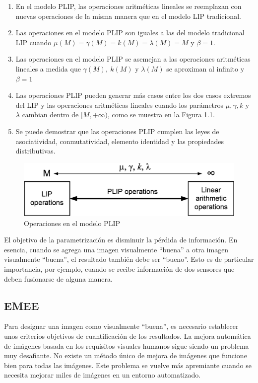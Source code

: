 \begin{enumerate}
	\item En el modelo PLIP, las operaciones aritméticas lineales se reemplazan con nuevas operaciones de la misma manera que en el modelo LIP tradicional.
	\item Las operaciones en el modelo PLIP son iguales a las del modelo tradicional LIP cuando $\mu(M) = \gamma(M) = k(M) = \lambda(M) = M$ y
	$\beta = 1$.
	\item Las operaciones en el modelo PLIP se asemejan a las operaciones aritméticas lineales a medida que $\gamma(M),~k(M)$ y $\lambda(M)$ se aproximan al infinito y $\beta = 1$
	\item Las operaciones PLIP pueden generar más casos entre los dos casos extremos del LIP y las operaciones aritméticas lineales cuando los parámetros $\mu, \gamma, k$ y $\lambda$ cambian dentro de $[M, +\infty)$, como se muestra en la Figura 1.1.
	\item Se puede demostrar que las operaciones PLIP cumplen las leyes de asociatividad, conmutatividad, elemento identidad y las propiedades distributivas.
\end{enumerate}

\begin{figure}
	\begin{center}
		\caption{Operaciones en el modelo PLIP}
		\includegraphics[width=8.0 cm]{images/plip_scheme.png}
	\end{center}
\end{figure}

El objetivo de la parametrizaci\'on es disminuir la p\'erdida de informaci\'on. En esencia, cuando se agrega una imagen visualmente ``buena'' a otra imagen visualmente ``buena'', el resultado también debe ser ``bueno''. Esto es de particular importancia, por ejemplo, cuando se recibe información de dos sensores que deben fusionarse de alguna manera.

\subsection{EMEE}

Para designar una imagen como visualmente ``buena'', es necesario establecer unos criterios objetivos de cuantificación de los resultados. La mejora automática de imágenes basada en los requisitos visuales humanos sigue siendo un problema muy desafiante. No existe un método único de mejora de imágenes que funcione bien para todas las imágenes. Este problema se vuelve más apremiante cuando se necesita mejorar miles de imágenes en un entorno automatizado.

